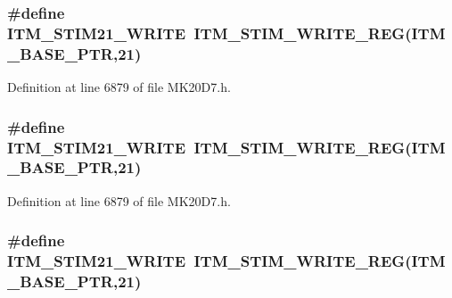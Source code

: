 \subsubsection[{\texorpdfstring{I\+T\+M\+\_\+\+S\+T\+I\+M21\+\_\+\+W\+R\+I\+TE}{ITM_STIM21_WRITE}}]{\setlength{\rightskip}{0pt plus 5cm}\#define I\+T\+M\+\_\+\+S\+T\+I\+M21\+\_\+\+W\+R\+I\+TE~{\bf I\+T\+M\+\_\+\+S\+T\+I\+M\+\_\+\+W\+R\+I\+T\+E\+\_\+\+R\+EG}({\bf I\+T\+M\+\_\+\+B\+A\+S\+E\+\_\+\+P\+TR},21)}\hypertarget{group___i_t_m___register___accessor___macros_gac7f186c8addcf22a51326064a6775a33}{}\label{group___i_t_m___register___accessor___macros_gac7f186c8addcf22a51326064a6775a33}


Definition at line 6879 of file M\+K20\+D7.\+h.

\subsubsection[{\texorpdfstring{I\+T\+M\+\_\+\+S\+T\+I\+M21\+\_\+\+W\+R\+I\+TE}{ITM_STIM21_WRITE}}]{\setlength{\rightskip}{0pt plus 5cm}\#define I\+T\+M\+\_\+\+S\+T\+I\+M21\+\_\+\+W\+R\+I\+TE~{\bf I\+T\+M\+\_\+\+S\+T\+I\+M\+\_\+\+W\+R\+I\+T\+E\+\_\+\+R\+EG}({\bf I\+T\+M\+\_\+\+B\+A\+S\+E\+\_\+\+P\+TR},21)}\hypertarget{group___i_t_m___register___accessor___macros_gac7f186c8addcf22a51326064a6775a33}{}\label{group___i_t_m___register___accessor___macros_gac7f186c8addcf22a51326064a6775a33}


Definition at line 6879 of file M\+K20\+D7.\+h.

\subsubsection[{\texorpdfstring{I\+T\+M\+\_\+\+S\+T\+I\+M21\+\_\+\+W\+R\+I\+TE}{ITM_STIM21_WRITE}}]{\setlength{\rightskip}{0pt plus 5cm}\#define I\+T\+M\+\_\+\+S\+T\+I\+M21\+\_\+\+W\+R\+I\+TE~{\bf I\+T\+M\+\_\+\+S\+T\+I\+M\+\_\+\+W\+R\+I\+T\+E\+\_\+\+R\+EG}({\bf I\+T\+M\+\_\+\+B\+A\+S\+E\+\_\+\+P\+TR},21)}\hypertarget{group___i_t_m___register___accessor___macros_gac7f186c8addcf22a51326064a6775a33}{}\label{group___i_t_m___register___accessor___macros_gac7f186c8addcf22a51326064a6775a33}


